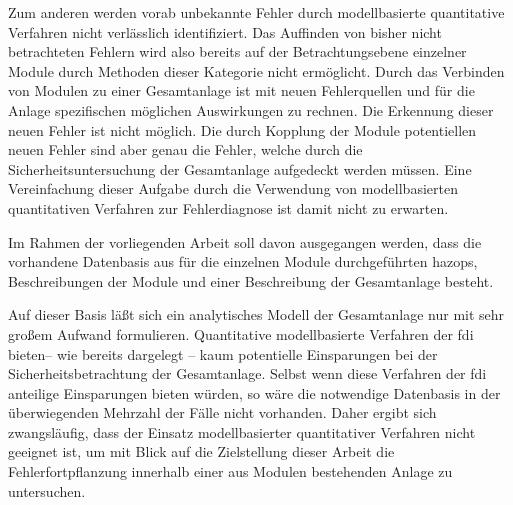Zum anderen werden vorab unbekannte Fehler durch modellbasierte quantitative Verfahren nicht verl\"asslich identifiziert. Das Auffinden von bisher nicht betrachteten Fehlern wird also bereits auf der Betrachtungsebene einzelner Module durch Methoden dieser Kategorie nicht erm\"oglicht. Durch das Verbinden von Modulen zu einer Gesamtanlage ist mit neuen Fehlerquellen und f\"ur die Anlage spezifischen m\"oglichen Auswirkungen zu rechnen. Die Erkennung dieser neuen Fehler ist nicht m\"oglich. Die durch Kopplung der Module potentiellen neuen Fehler sind aber genau die Fehler, welche durch die Sicherheitsuntersuchung der Gesamtanlage aufgedeckt werden m\"ussen. Eine Vereinfachung dieser Aufgabe durch die Verwendung von modellbasierten quantitativen Verfahren zur Fehlerdiagnose ist damit nicht zu erwarten.

Im Rahmen der vorliegenden Arbeit soll davon ausgegangen werden, dass die vorhandene Datenbasis aus f\"ur die einzelnen Module durchgef\"uhrten \acp{hazop}, Beschreibungen der Module und einer Beschreibung der Gesamtanlage besteht. 

Auf dieser Basis l\"a\ss{}t sich ein analytisches Modell der Gesamtanlage nur mit sehr gro\ss{}em Aufwand formulieren. Quantitative modellbasierte Verfahren der \ac{fdi} bieten-- wie bereits dargelegt -- kaum potentielle Einsparungen bei der Sicherheitsbetrachtung der Gesamtanlage. Selbst wenn diese Verfahren der \ac{fdi} anteilige Einsparungen bieten w\"urden, so w\"are die notwendige Datenbasis in der \"uberwiegenden Mehrzahl der F\"alle nicht vorhanden. Daher ergibt sich zwangsl\"aufig, dass der Einsatz modellbasierter quantitativer Verfahren nicht geeignet ist, um mit Blick auf die Zielstellung dieser Arbeit die Fehlerfortpflanzung innerhalb einer aus Modulen bestehenden Anlage zu untersuchen.
 
